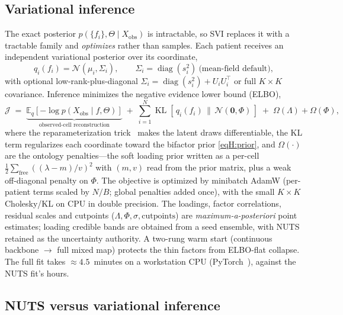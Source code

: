 \subsection{Variational inference}

The exact posterior $p(\{f_i\},\Theta\mid X_{\mathrm{obs}})$ is intractable, so SVI replaces it
with a tractable family and \emph{optimizes} rather than samples. Each patient receives an
independent variational posterior over its coordinate,
\begin{equation}
  q_i(f_i)=\mathcal N(\mu_i,\Sigma_i),\qquad
  \Sigma_i=\operatorname{diag}(s_i^2)\ \text{(mean-field default)},
  \label{eqH:q}
\end{equation}
with optional low-rank-plus-diagonal $\Sigma_i=\operatorname{diag}(s_i^2)+U_iU_i^{\top}$ or full
$K\times K$ covariance. Inference minimizes the negative evidence lower bound (ELBO),
\begin{equation}
  \mathcal J \;=\; \underbrace{\mathbb E_{q}\!\left[-\log p(X_{\mathrm{obs}}\mid f,\Theta)\right]}_{\text{observed-cell reconstruction}}
  \;+\; \sum_{i=1}^{N}\operatorname{KL}\!\left[\,q_i(f_i)\,\big\|\,\mathcal N(\mathbf 0,\Phi)\,\right]
  \;+\; \Omega(\Lambda) + \Omega(\Phi),
  \label{eqH:elbo}
\end{equation}
where the reparameterization trick~\citep{kingma2014vae} makes the latent draws differentiable,
the KL term regularizes each coordinate toward the bifactor prior \eqref{eqH:prior}, and
$\Omega(\cdot)$ are the ontology penalties---the soft loading prior written as a per-cell
$\tfrac12\sum_{\text{free}}((\lambda-m)/v)^2$ with $(m,v)$ read from the prior matrix, plus a
weak off-diagonal penalty on $\Phi$. The objective is optimized by minibatch AdamW (per-patient
terms scaled by $N/B$; global penalties added once), with the small $K\times K$ Cholesky/KL on
CPU in double precision. The loadings, factor correlations, residual scales and cutpoints
($\Lambda,\Phi,\sigma,\text{cutpoints}$) are \emph{maximum-a-posteriori} point estimates;
loading credible bands are obtained from a seed ensemble, with NUTS retained as the
uncertainty authority. A two-rung warm start (continuous backbone $\to$ full mixed map)
protects the thin factors from ELBO-flat collapse. The full fit takes ${\approx}4.5$~minutes on
a workstation CPU (PyTorch~\citep{paszke2019pytorch}), against the NUTS fit's hours.

\subsection{NUTS versus variational inference}

